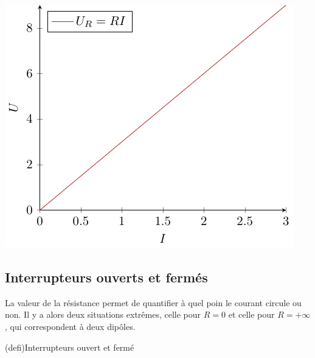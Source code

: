 \documentclass[../../main/main.tex]{subfiles}
\begin{document}
\begin{tcbraster}[raster columns=2, raster equal height=rows]
\begin{tcb}[label=exem:resistance]
\begin{center}
{				\includegraphics[width=.7\linewidth]{carac_R}
			}%
		\end{center}
	\end{tcb}
\end{tcbraster}

\vspace{-15pt}
\subsection{Interrupteurs ouverts et fermés}
La valeur de la résistance permet de quantifier à quel poin le courant
circule ou non. Il y a alors deux situations extrêmes, celle pour $R = 0$ et
celle pour $R = +\infty$, qui correspondent à deux dipôles.

\begin{tcb*}[sidebyside](defi){Interrupteurs ouvert et fermé}
	\psw{%
		\[
			\boxed{R = +\infty}
		\]
	}%
	\vspace{-15pt}
	\tcblower
	\psw{%
		\[
			\boxed{R = 0}
		\]
	}%
	\vspace{-15pt}
\end{tcb*}
\end{document}

